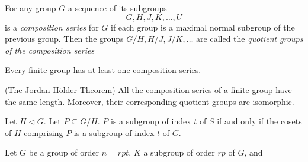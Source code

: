 For any group $G$ a sequence of its subgroups
\[G, H, J, K, \ldots, U\]
is a \textit{composition series} for $G$ if each group is a maximal normal subgroup of the previous group. Then the groups $G/H, H/J, J/K, \ldots$ are called the \textit{quotient groups of the composition series}

\theorem
Every finite group has at least one composition series.

\theorem (The Jordan-Hölder Theorem)
All the composition series of a finite group have the same length. Moreover, their corresponding quotient groups are isomorphic.

\theorem 
Let $H \triangleleft G$. Let $P \subseteq G/H$. $P$ is a subgroup of index $t$ of $S$ if and only if the cosets of $H$ comprising $P$ is a subgroup of index $t$ of $G$.

\theorem 
Let $G$ be a group of order $n = rpt$, $K$ a subgroup of order $rp$ of $G$, and
